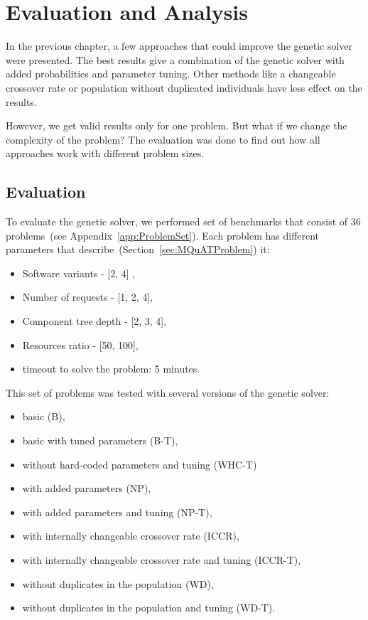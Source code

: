 \chapter{Evaluation and Analysis}

In the previous chapter, a few approaches that could improve the genetic solver were presented.
The best results give a combination of the genetic solver with added probabilities and parameter tuning.
Other methods like a changeable crossover rate or population without duplicated individuals have less effect on the results.

However, we get valid results only for one problem. But what if we change the complexity of the problem? The evaluation was done to find out how all approaches work with different problem sizes. 

\section{Evaluation}
\label{sec:evaluation}

To evaluate the genetic solver, we performed set of benchmarks that consist of 36 problems~(see Appendix~\ref{app:ProblemSet}). Each problem has different parameters that describe~(Section~\ref{sec:MQuATProblem}) it:

\begin{itemize}
	\item Software variants - [2, 4] ,
	\item Number of requests - [1, 2, 4],
	\item Component tree depth - [2, 3, 4],
	\item  Resources ratio - [50, 100],
	\item timeout to solve the problem: 5 minutes.
\end{itemize}

This set of problems was tested with several versions of the genetic solver:

\begin{itemize}
	\item basic (B),
	\item basic with tuned parameters (B-T),
	\item without hard-coded parameters and tuning (WHC-T) 
	\item with added parameters (NP),
	\item with added parameters and tuning (NP-T),
	\item with internally changeable crossover rate (ICCR),
	\item with internally changeable crossover rate and tuning (ICCR-T),
	\item without duplicates in the population (WD),
	\item without duplicates in the population and tuning (WD-T).
\end{itemize}

